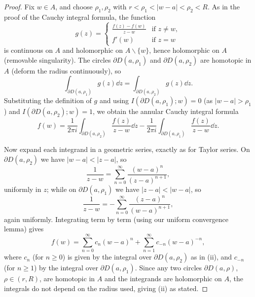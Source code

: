\documentclass[a4paper]{scrartcl}
\begin{document}
\begin{proof}
    Fix $w \in A$, and choose $\rho_1, \rho_2$ with $r < \rho_1 < |w - a| < \rho_2 < R$. As in the proof of the Cauchy integral formula, the function
    $$
    g(z) = \begin{cases}
        \frac{f(z) - f(w)}{z - w} &\mbox{if } z \neq w, \\
        f'(w) &\mbox{if } z = w
       \end{cases}
    $$
    is continuous on $A$ and holomorphic on $A \backslash \{w\}$, hence holomorphic on $A$ (removable singularity). The circles $\partial D(a, \rho_1)$ and $\partial D(a, \rho_2)$ are homotopic in $A$ (deform the radius continuously), so
    $$
    \int_{\partial D(a, \rho_1)} g(z) \dd z = \int_{\partial D(a, \rho_2)} g(z) \dd z.
    $$
    Substituting the definition of $g$ and using $I(\partial D(a, \rho_1); w) = 0$ (as $|w - a| > \rho_1$) and $I(\partial D(a, \rho_2); w) = 1$, we obtain the annular Cauchy integral formula
    $$
    f(w) = \frac{1}{2\pi i}\int_{\partial D(a, \rho_2)} \frac{f(z)}{z - w} \dd z - \frac{1}{2 \pi i}\int_{\partial D(a, \rho_1)} \frac{f(z)}{z - w} \dd z.
    $$

    Now expand each integrand in a geometric series, exactly as for Taylor series. On $\partial D(a, \rho_2)$ we have $|w - a| < |z - a|$, so
    $$
    \frac{1}{z - w} = \sum_{n = 0}^{\infty} \frac{(w - a)^n}{(z - a)^{n + 1}},
    $$
    uniformly in $z$; while on $\partial D(a, \rho_1)$ we have $|z - a| < |w - a|$, so
    $$
    \frac{1}{z - w} = -\sum_{n = 0}^{\infty} \frac{(z - a)^n}{(w - a)^{n + 1}},
    $$
    again uniformly. Integrating term by term (using our uniform convergence lemma) gives
    $$
    f(w) = \sum_{n = 0}^{\infty} c_n (w - a)^n + \sum_{n = 1}^{\infty} c_{-n}(w - a)^{-n},
    $$
    where $c_n$ (for $n \geq 0$) is given by the integral over $\partial D(a, \rho_2)$ as in (ii), and $c_{-n}$ (for $n \geq 1$) by the integral over $\partial D(a, \rho_1)$. Since any two circles $\partial D(a, \rho)$, $\rho \in (r, R)$, are homotopic in $A$ and the integrands are holomorphic on $A$, the integrals do not depend on the radius used, giving (ii) as stated.


\end{proof}
\end{document}

